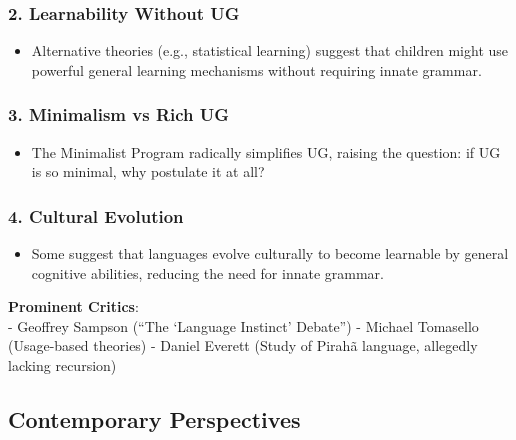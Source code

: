 \documentclass[12pt]{article}
\newcommand{\tightlist}{\itemsep 0pt\parskip 0pt\parsep 0pt}
\begin{document}
\hypertarget{learnability-without-ug}{%
\subsubsection{\texorpdfstring{2. \textbf{Learnability Without
UG}}{2. Learnability Without UG}}\label{learnability-without-ug}}

\begin{itemize}
\tightlist
\item
  Alternative theories (e.g., statistical learning) suggest that
  children might use powerful general learning mechanisms without
  requiring innate grammar.
\end{itemize}

\hypertarget{minimalism-vs-rich-ug}{%
\subsubsection{\texorpdfstring{3. \textbf{Minimalism vs Rich
UG}}{3. Minimalism vs Rich UG}}\label{minimalism-vs-rich-ug}}

\begin{itemize}
\tightlist
\item
  The Minimalist Program radically simplifies UG, raising the question:
  if UG is so minimal, why postulate it at all?
\end{itemize}

\hypertarget{cultural-evolution}{%
\subsubsection{\texorpdfstring{4. \textbf{Cultural
Evolution}}{4. Cultural Evolution}}\label{cultural-evolution}}

\begin{itemize}
\tightlist
\item
  Some suggest that languages evolve culturally to become learnable by
  general cognitive abilities, reducing the need for innate grammar.
\end{itemize}

\textbf{Prominent Critics}:\\
- Geoffrey Sampson (``The `Language Instinct' Debate'') - Michael
Tomasello (Usage-based theories) - Daniel Everett (Study of Pirahã
language, allegedly lacking recursion)

\hypertarget{contemporary-perspectives}{%
\subsection{Contemporary Perspectives}\label{contemporary-perspectives}}
\end{document}

